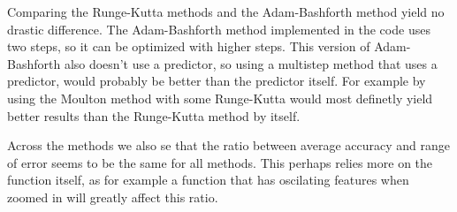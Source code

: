 \documentclass[10pt]{article}
\begin{document}
Comparing the Runge-Kutta methods and the Adam-Bashforth method yield no drastic difference. The
Adam-Bashforth method implemented in the code uses two steps, so it can be optimized with higher steps. This version of Adam-Bashforth also doesn't use a predictor, so using a multistep
method that uses a predictor, would probably be better than the predictor itself. For example by using the Moulton method with some Runge-Kutta would most definetly yield better results than
the Runge-Kutta method by itself.

Across the methods we also se that the ratio between average accuracy and range of error seems
to be the same for all methods. This perhaps relies more on the function itself, as for example
a function that has oscilating features when zoomed in will greatly affect this ratio. 
\end{document}
